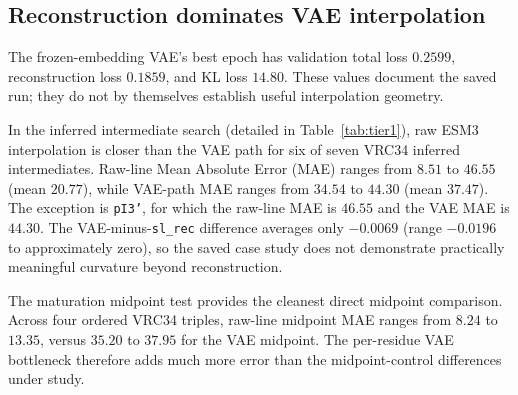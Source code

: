\subsection{Reconstruction dominates VAE interpolation}
\label{sec:vae_results}

The frozen-embedding VAE's best epoch has validation total loss $0.2599$,
reconstruction loss $0.1859$, and KL loss $14.80$. These values document the
saved run; they do not by themselves establish useful interpolation geometry.

In the inferred intermediate search (detailed in Table~\ref{tab:tier1}), raw
ESM3 interpolation is closer than the VAE path for six of seven VRC34 inferred
intermediates. Raw-line Mean Absolute Error (MAE) ranges from $8.51$ to $46.55$
(mean $20.77$), while VAE-path MAE ranges from $34.54$ to $44.30$ (mean
$37.47$). The exception is \texttt{pI3'}, for which the raw-line MAE is $46.55$
and the VAE MAE is $44.30$. The VAE-minus-\texttt{sl\_rec} difference averages
only $-0.0069$ (range $-0.0196$ to approximately zero), so the saved case study
does not demonstrate practically meaningful curvature beyond reconstruction.

The maturation midpoint test provides the cleanest direct midpoint comparison.
Across four ordered VRC34 triples, raw-line midpoint MAE ranges from $8.24$ to
$13.35$, versus $35.20$ to $37.95$ for the VAE midpoint. The per-residue VAE
bottleneck therefore adds much more error than the midpoint-control differences
under study.

\begin{table}[t]
\centering
\footnotesize
\setlength{\tabcolsep}{4pt}
\caption{Exact embedding-space MAE per dimension/residue for VRC34 intermediates (inferred intermediate search). The reconstructed straight-line control provides the comparison for VAE performance.}
\label{tab:tier1}
\end{table}

